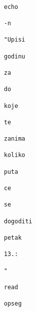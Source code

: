 \documentclass{exam}
\begin{document}
\begin{itemize}
\begin{lstlisting}
                                                                                                                        echo
                                                                                                                        -n
                                                                                                                        "Upisi
                                                                                                                        godinu
                                                                                                                        za
                                                                                                                        do
                                                                                                                        koje
                                                                                                                        te
                                                                                                                        zanima
                                                                                                                        koliko
                                                                                                                        puta
                                                                                                                        ce
                                                                                                                        se
                                                                                                                        dogoditi
                                                                                                                        petak
                                                                                                                        13.:
                                                                                                                        "
                                                                                                                        read
                                                                                                                        opseg


\end{lstlisting}
\end{itemize}
\end{document}
